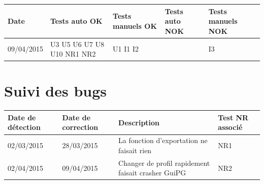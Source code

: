 \documentclass{../res/univ-projet}
\begin{document}
\begin{center}
    \begin{tabular}{|p{2cm}|p{3.1cm}|p{3.1cm}|p{3.1cm}|p{3.1cm}|}
      \hline
      Date & Tests auto OK & Tests manuels OK & Tests auto NOK & Tests manuels NOK\\ \hline
      09/04/2015 & U3 U5 U6 U7 U8 U10 NR1 NR2 & U1 I1 I2 &  & I3 \\ \hline

  \end{tabular}  
\end{center}

\section{Suivi des bugs}

\begin{center}
    \begin{tabular}{|p{1.9cm}|p{1.9cm}|p{9cm}|p{1.9cm}|}
      \hline
      Date de détection & Date de correction & Description & Test NR associé\\ \hline
      02/03/2015 & 28/03/2015 & La fonction d'exportation ne faisait rien & NR1\\ \hline
      02/04/2015 & 09/04/2015 & Changer de profil rapidement faisait crasher GuiPG & NR2\\ \hline
  \end{tabular}  
\end{center}
\end{document}
